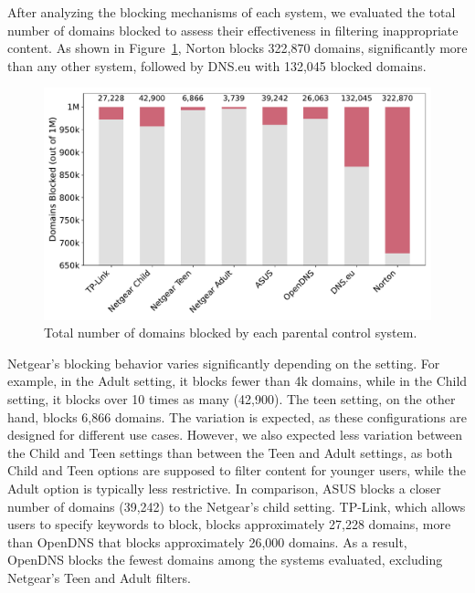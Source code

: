 After analyzing the blocking mechanisms of each system, we evaluated the total number of domains blocked to assess their effectiveness in filtering inappropriate content. As shown in Figure~\ref{fig:blocked_domains}, Norton blocks 322,870 domains, significantly more than any other system, followed by DNS.eu with 132,045 blocked domains. %
\begin{figure}
    \centering
    \includegraphics[width=0.85\columnwidth]{Images/Results/blocked_domains_per_tool.pdf}
    \caption{Total number of domains blocked by each parental control system.}
    \label{fig:blocked_domains}
\end{figure}
Netgear’s blocking behavior varies significantly depending on the setting. For example, in the Adult setting, it blocks fewer than 4k domains, while in the Child setting, it blocks over 10 times as many (42,900). The teen setting, on the other hand, blocks 6,866 domains.
The variation is expected, as these configurations are designed for different use cases. However, we also expected less variation between the Child and Teen settings than between the Teen and Adult settings, as both Child and Teen options are supposed to filter content for younger users, while the Adult option is typically less restrictive.
In comparison, ASUS blocks a closer number of domains (39,242) to the Netgear's child setting. TP-Link, which allows users to specify keywords to block, blocks approximately 27,228 domains, more than OpenDNS that blocks approximately 26,000 domains. As a result, OpenDNS blocks the fewest domains among the systems evaluated, excluding Netgear’s Teen and Adult filters.

